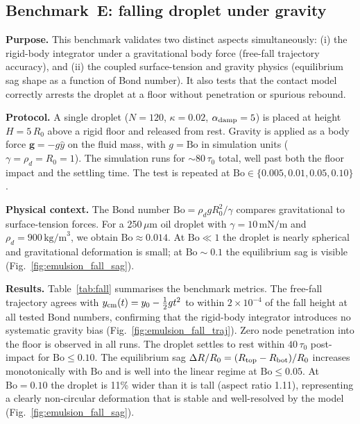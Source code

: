 \documentclass[aps,pre,twocolumn,floatfix,longbibliography]{revtex4-2}
\begin{document}
\subsection{Benchmark~E: falling droplet under gravity}
\label{sec:emulsion_benchmarks_E}

\textbf{Purpose.}  This benchmark validates two distinct aspects simultaneously:
(i) the rigid-body integrator under a gravitational body force (free-fall trajectory
accuracy), and (ii) the coupled surface-tension and gravity physics (equilibrium sag
shape as a function of Bond number).  It also tests that the contact model correctly
arrests the droplet at a floor without penetration or spurious rebound.

\textbf{Protocol.}  A single droplet ($N = 120$, $\kappa = 0.02$, $\alpha_{\rm damp} = 5$)
is placed at height $H = 5\,R_0$ above a rigid floor and released from rest.  Gravity
is applied as a body force $\mathbf{g} = -g\hat{y}$ on the fluid mass, with
$g = \mathrm{Bo}$ in simulation units ($\gamma = \rho_d = R_0 = 1$).  The simulation
runs for $\sim$\!$80\,\tau_0$ total, well past both the floor impact and the settling
time.  The test is repeated at $\mathrm{Bo} \in \{0.005, 0.01, 0.05, 0.10\}$.

\textbf{Physical context.}  The Bond number $\mathrm{Bo} = \rho_d g R_0^2/\gamma$
compares gravitational to surface-tension forces.  For a 250\,$\mu$m oil droplet with
$\gamma = 10\,\text{mN/m}$ and $\rho_d = 900\,\text{kg/m}^3$, we obtain
$\mathrm{Bo} \approx 0.014$.  At $\mathrm{Bo} \ll 1$ the droplet is nearly spherical
and gravitational deformation is small; at $\mathrm{Bo} \sim 0.1$ the equilibrium sag
is visible (Fig.~\ref{fig:emulsion_fall_sag}).

\textbf{Results.}  Table~\ref{tab:fall} summarises the benchmark metrics.  The
free-fall trajectory agrees with $y_{\rm cm}(t) = y_0 - \frac{1}{2}gt^2$ to within
$2 \times 10^{-4}$ of the fall height at all tested Bond numbers, confirming that the
rigid-body integrator introduces no systematic gravity bias
(Fig.~\ref{fig:emulsion_fall_traj}).  Zero node penetration
into the floor is observed in all runs.  The droplet settles to rest within $40\,\tau_0$
post-impact for $\mathrm{Bo} \leq 0.10$.  The equilibrium sag
$\Delta R/R_0 = (R_{\rm top} - R_{\rm bot})/R_0$ increases monotonically with
$\mathrm{Bo}$ and is well into the linear regime at $\mathrm{Bo} \leq 0.05$.
At $\mathrm{Bo} = 0.10$ the droplet is 11\% wider than it is tall (aspect ratio 1.11),
representing a clearly non-circular deformation that is stable and well-resolved
by the model (Fig.~\ref{fig:emulsion_fall_sag}).
\end{document}

